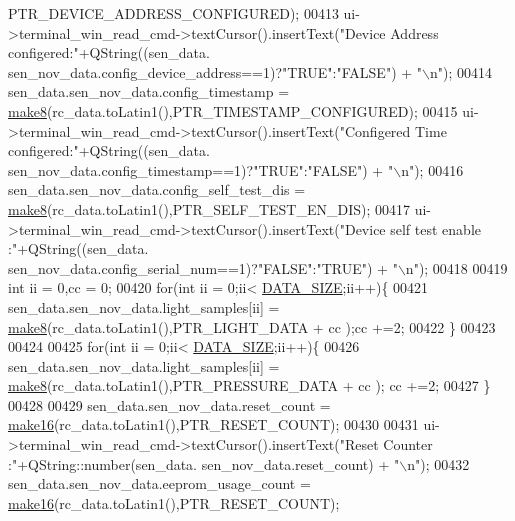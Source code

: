 \begin{DoxyCode}
      PTR\_DEVICE\_ADDRESS\_CONFIGURED);
00413       ui->terminal\_win\_read\_cmd->textCursor().insertText(\textcolor{stringliteral}{"Device Address configered:"}+QString((sen\_data.
      sen\_nov\_data.config\_device\_address==1)?\textcolor{stringliteral}{"TRUE"}:\textcolor{stringliteral}{"FALSE"}) + \textcolor{stringliteral}{"\(\backslash\)n"});
00414       sen\_data.sen\_nov\_data.config\_timestamp = \hyperlink{a00006_aebce94d5e6af7afff661daf74b208de1}{make8}(rc\_data.toLatin1(),PTR\_TIMESTAMP\_CONFIGURED);
00415       ui->terminal\_win\_read\_cmd->textCursor().insertText(\textcolor{stringliteral}{"Configered Time configered:"}+QString((sen\_data.
      sen\_nov\_data.config\_timestamp==1)?\textcolor{stringliteral}{"TRUE"}:\textcolor{stringliteral}{"FALSE"}) + \textcolor{stringliteral}{"\(\backslash\)n"});
00416       sen\_data.sen\_nov\_data.config\_self\_test\_dis = \hyperlink{a00006_aebce94d5e6af7afff661daf74b208de1}{make8}(rc\_data.toLatin1(),PTR\_SELF\_TEST\_EN\_DIS);
00417       ui->terminal\_win\_read\_cmd->textCursor().insertText(\textcolor{stringliteral}{"Device self test enable :"}+QString((sen\_data.
      sen\_nov\_data.config\_serial\_num==1)?\textcolor{stringliteral}{"FALSE"}:\textcolor{stringliteral}{"TRUE"}) + \textcolor{stringliteral}{"\(\backslash\)n"});
00418 
00419       \textcolor{keywordtype}{int} ii = 0,cc = 0;
00420       \textcolor{keywordflow}{for}(\textcolor{keywordtype}{int} ii = 0;ii< \hyperlink{a00039_af55149bc1f05cf18af067a302e31e3f9}{DATA\_SIZE};ii++)\{
00421           sen\_data.sen\_nov\_data.light\_samples[ii] = \hyperlink{a00006_aebce94d5e6af7afff661daf74b208de1}{make8}(rc\_data.toLatin1(),PTR\_LIGHT\_DATA + cc );cc 
      +=2;
00422       \}
00423 
00424 
00425       \textcolor{keywordflow}{for}(\textcolor{keywordtype}{int} ii = 0;ii< \hyperlink{a00039_af55149bc1f05cf18af067a302e31e3f9}{DATA\_SIZE};ii++)\{
00426           sen\_data.sen\_nov\_data.light\_samples[ii] = \hyperlink{a00006_aebce94d5e6af7afff661daf74b208de1}{make8}(rc\_data.toLatin1(),PTR\_PRESSURE\_DATA + cc );
      cc +=2;
00427       \}
00428 
00429       sen\_data.sen\_nov\_data.reset\_count = \hyperlink{a00006_afcb06d9f3a6a555df9355af1dfbb4e21}{make16}(rc\_data.toLatin1(),PTR\_RESET\_COUNT);
00430 
00431       ui->terminal\_win\_read\_cmd->textCursor().insertText(\textcolor{stringliteral}{"Reset Counter   :"}+QString::number(sen\_data.
      sen\_nov\_data.reset\_count) + \textcolor{stringliteral}{"\(\backslash\)n"});
00432       sen\_data.sen\_nov\_data.eeprom\_usage\_count = \hyperlink{a00006_afcb06d9f3a6a555df9355af1dfbb4e21}{make16}(rc\_data.toLatin1(),PTR\_RESET\_COUNT);

\end{DoxyCode}
